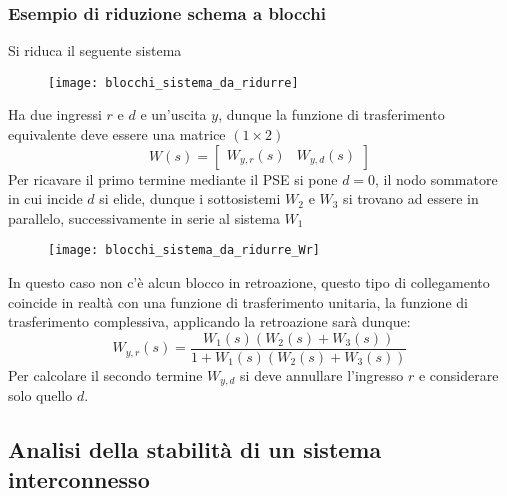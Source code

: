 \newpage
\subsubsection{Esempio di riduzione schema a blocchi}
Si riduca il seguente sistema
\begin{figure}[h]
\centering
\texttt{[image: blocchi\_sistema\_da\_ridurre]}
\end{figure}

Ha due ingressi $r$ e $d$ e un'uscita $y$, dunque la funzione di trasferimento
equivalente deve essere una matrice $(1\times2)$
$$
W(s) = \begin{bmatrix}
W_{y,r}(s) & W_{y,d}(s)
\end{bmatrix}
$$
Per ricavare il primo termine mediante il PSE si pone $d=0$, il nodo sommatore
in cui incide $d$ si elide, dunque i sottosistemi $W_2$ e $W_3$ si trovano ad
essere in parallelo, successivamente in serie al sistema $W_1$
\begin{figure}[h]
\centering
\texttt{[image: blocchi\_sistema\_da\_ridurre\_Wr]}
\end{figure}
In questo caso non c'è alcun blocco in retroazione, questo tipo di
collegamento coincide in realtà con una funzione di trasferimento unitaria, la
funzione di trasferimento complessiva, applicando la retroazione sarà dunque:
$$
W_{y,r}(s) = \frac{W_1(s)(W_2(s) + W_3(s))}{1 + W_1(s)(W_2(s) + W_3(s))}
$$
Per calcolare il secondo termine $W_{y,d}$ si deve annullare l'ingresso $r$ e
considerare solo quello $d$.

\newpage
\subsection{Analisi della stabilità di un sistema interconnesso}
